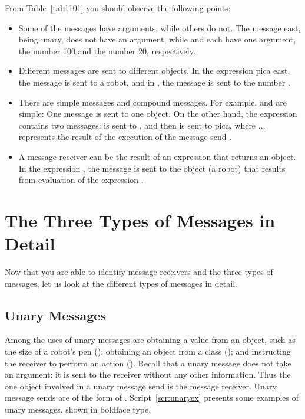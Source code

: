 \documentclass[a4paper,10pt,twoside]{book}
\begin{document}
From Table~\ref{tab1101} you should observe the following points: 
\begin{itemize} 
	
	\item Some of the messages have arguments, while others do not. The message east, being 
unary, does not have an argument, while  and  each have one argument, 
the number 100 and the number 20, respectively. 
\item  Different messages are sent to different objects. In the expression pica east, the message
 is sent to a robot, and in , the message  is sent to the number . 

\item  There are simple messages and compound messages. For example,  and 
 are simple: One message is sent to one object. On the other hand, the expression 
 contains two messages:  is sent to , and then  is sent to 
pica, where ... represents the result of the execution of the message send . 
\item  A message receiver can be the result of an expression that returns an object. In the 
expression , the message  is sent to the object (a robot) that 
results from evaluation of the expression . 
\end{itemize}

\section{The Three Types of Messages in Detail}
Now that you are able to identify message receivers and the three types of messages, let us 
look at the different types of messages in detail. 


\subsection{Unary Messages}

Among the uses of unary messages are obtaining a value from an object, such as the size of a 
robot’s pen (); obtaining an object from a class (); and instructing 
the receiver to perform an action (). Recall that a unary message does not 
take an argument: it is sent to the receiver without any other information. Thus the one object 
involved in a unary message send is the message receiver. Unary message sends are of the 
form of . Script~\ref{scr:unaryex} presents some examples of unary messages, shown 
in boldface type. 
\end{document}
